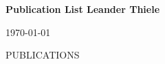 \documentclass{article}
\begin{document}
\begin{center}
  \textbf{Publication List Leander Thiele}

  \today
\end{center}

PUBLICATIONS
\end{document}
